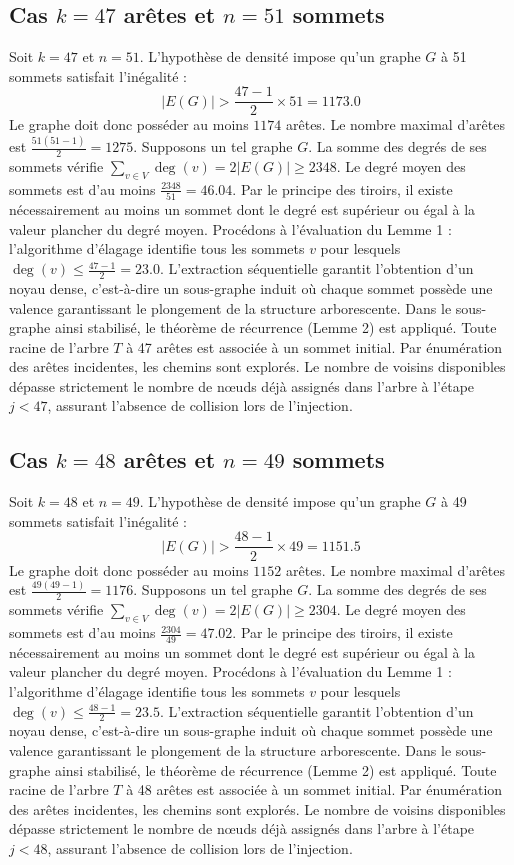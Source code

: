 \documentclass[12pt,a4paper]{article}
\begin{document}
\subsection{Cas $k = 47$ arêtes et $n = 51$ sommets}
Soit $k = 47$ et $n = 51$. L'hypothèse de densité impose qu'un graphe $G$ à 51 sommets satisfait l'inégalité :
$$ |E(G)| > \frac{47-1}{2} \times 51 = 1173.0 $$
Le graphe doit donc posséder au moins $1174$ arêtes. Le nombre maximal d'arêtes est $\frac{51(51-1)}{2} = 1275$.
Supposons un tel graphe $G$. La somme des degrés de ses sommets vérifie $\sum_{v \in V} \deg(v) = 2|E(G)| \geq 2348$.
Le degré moyen des sommets est d'au moins $\frac{2348}{51} = 46.04$.
Par le principe des tiroirs, il existe nécessairement au moins un sommet dont le degré est supérieur ou égal à la valeur plancher du degré moyen.
Procédons à l'évaluation du Lemme 1 : l'algorithme d'élagage identifie tous les sommets $v$ pour lesquels $\deg(v) \leq \frac{47-1}{2} = 23.0$.
L'extraction séquentielle garantit l'obtention d'un noyau dense, c'est-à-dire un sous-graphe induit où chaque sommet possède une valence garantissant le plongement de la structure arborescente.
Dans le sous-graphe ainsi stabilisé, le théorème de récurrence (Lemme 2) est appliqué. Toute racine de l'arbre $T$ à 47 arêtes est associée à un sommet initial. Par énumération des arêtes incidentes, les chemins sont explorés. Le nombre de voisins disponibles dépasse strictement le nombre de nœuds déjà assignés dans l'arbre à l'étape $j < 47$, assurant l'absence de collision lors de l'injection.

\subsection{Cas $k = 48$ arêtes et $n = 49$ sommets}
Soit $k = 48$ et $n = 49$. L'hypothèse de densité impose qu'un graphe $G$ à 49 sommets satisfait l'inégalité :
$$ |E(G)| > \frac{48-1}{2} \times 49 = 1151.5 $$
Le graphe doit donc posséder au moins $1152$ arêtes. Le nombre maximal d'arêtes est $\frac{49(49-1)}{2} = 1176$.
Supposons un tel graphe $G$. La somme des degrés de ses sommets vérifie $\sum_{v \in V} \deg(v) = 2|E(G)| \geq 2304$.
Le degré moyen des sommets est d'au moins $\frac{2304}{49} = 47.02$.
Par le principe des tiroirs, il existe nécessairement au moins un sommet dont le degré est supérieur ou égal à la valeur plancher du degré moyen.
Procédons à l'évaluation du Lemme 1 : l'algorithme d'élagage identifie tous les sommets $v$ pour lesquels $\deg(v) \leq \frac{48-1}{2} = 23.5$.
L'extraction séquentielle garantit l'obtention d'un noyau dense, c'est-à-dire un sous-graphe induit où chaque sommet possède une valence garantissant le plongement de la structure arborescente.
Dans le sous-graphe ainsi stabilisé, le théorème de récurrence (Lemme 2) est appliqué. Toute racine de l'arbre $T$ à 48 arêtes est associée à un sommet initial. Par énumération des arêtes incidentes, les chemins sont explorés. Le nombre de voisins disponibles dépasse strictement le nombre de nœuds déjà assignés dans l'arbre à l'étape $j < 48$, assurant l'absence de collision lors de l'injection.
\end{document}
